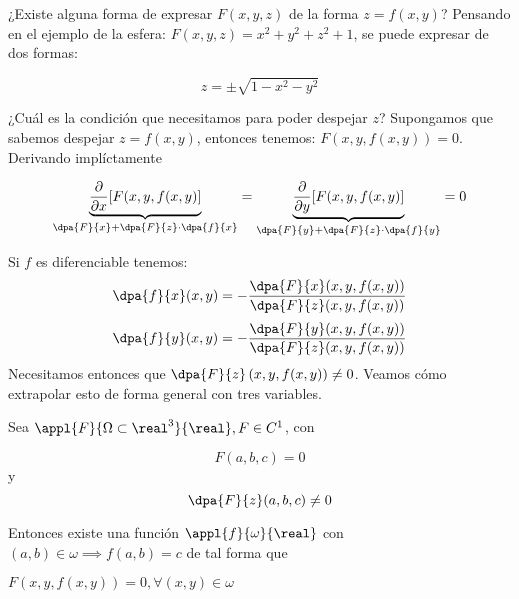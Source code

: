 ¿Existe alguna forma de expresar $F(x,y,z)$ de la forma $z=f(x,y)$? Pensando en el ejemplo de la esfera: $F(x,y,z) = x^2+y^2+z^2+1$, se puede expresar de dos formas:

\[ z = \pm \sqrt{1 - x^2 - y^2} \]

¿Cuál es la condición que necesitamos para poder despejar $z$? Supongamos que sabemos despejar $z=f(x,y)$, entonces tenemos: $F(x,y,f(x,y)) = 0$. Derivando implíctamente

\[ \underbrace{\frac{\partial}{\partial x} [F(x,y,f(x,y)]}_{\dpa{F}{x} + \dpa{F}{z}\cdot\dpa{f}{x}}= \underbrace{\frac{\partial}{\partial y} [F(x,y,f(x,y)]}_{\dpa{F}{y} + \dpa{F}{z}\cdot\dpa{f}{y}} = 0 \]

Si $f$ es diferenciable tenemos:
$$\dpa{f}{x}(x,y) = - \frac{\dpa{F}{x}(x,y,f(x,y))}{\dpa{F}{z}(x,y,f(x,y))}$$
$$\dpa{f}{y}(x,y) = - \frac{\dpa{F}{y}(x,y,f(x,y))}{\dpa{F}{z}(x,y,f(x,y))}$$
Necesitamos entonces que $\displaystyle\dpa{F}{z}\left(x,y,f(x,y)\right) \neq 0$. Veamos cómo extrapolar esto de forma general con tres variables.

\begin{theorem} 

\label{TFImp}

Sea $\appl{F}{\Omega\subset\real^3}{\real}, F\in C^1$, con

\[ F(a,b,c) = 0 \] y \[ \dpa{F}{z}(a,b,c)\neq 0 \]

Entonces existe una función $\appl{f}{\omega}{\real}$ con $(a,b)\in \omega \implies  f(a,b) = c$ de tal forma que

$F(x,y,f(x,y)) = 0, \forall(x,y)\in \omega$

\end{theorem}

